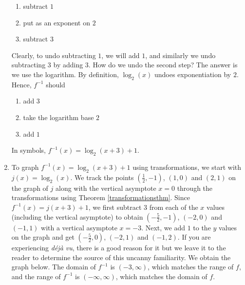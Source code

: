 \begin{ex}
\begin{enumerate}
\begin{enumerate}

\item subtract $1$

\item put as an exponent on $2$

\item subtract $3$

\end{enumerate}

Clearly, to undo subtracting $1$, we will add $1$, and similarly we undo subtracting $3$ by adding $3$.  How do we undo the second step?  The answer is we use the logarithm.  By definition, $\log_{2}(x)$ undoes exponentiation by $2$.  Hence, $f^{-1}$ should

\begin{enumerate}

\item add $3$

\item take the logarithm base $2$

\item add $1$

\end{enumerate}

In symbols, $f^{-1}(x) = \log_{2}(x+3)+1$.  


\item  To graph $f^{-1}(x) = \log_{2}(x+3)+1$ using transformations, we start with $j(x) = \log_{2}(x)$.  We track the points $\left(\frac{1}{2},-1\right)$, $(1,0)$ and $(2, 1)$ on the graph of $j$ along with the vertical asymptote $x=0$ through the transformations using Theorem \ref{transformationsthm}.  Since $f^{-1}(x) = j(x+3)+1$, we first subtract $3$ from each of the $x$ values (including the vertical asymptote) to obtain  $\left(-\frac{5}{2},-1\right)$, $(-2,0)$ and $(-1, 1)$ with a vertical asymptote $x = -3$.  Next, we add $1$ to the $y$ values on the graph and get $\left(-\frac{5}{2},0\right)$, $(-2,1)$ and $(-1, 2)$.  If you are experiencing \textit{d\'{e}j\`{a} vu}, there is a good reason for it but we leave it to the reader to determine the source of this uncanny familiarity.  We obtain the graph below.  The domain of $f^{-1}$ is $(-3, \infty)$, which matches the range of $f$, and the range of $f^{-1}$ is $(-\infty, \infty)$, which matches the domain of $f$.

\[\begin{array}{ccc}


\end{array}\]
\end{enumerate}
\end{ex}
